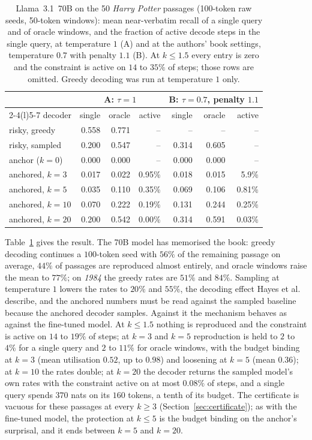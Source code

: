 \begin{table}[t]
\centering
\caption{Llama~3.1~70B on the 50 \emph{Harry Potter} passages (100-token raw seeds, 50-token windows): mean near-verbatim recall of a single query and of oracle windows, and the fraction of active decode steps in the single query, at temperature $1$ (A) and at the authors' book settings, temperature $0.7$ with penalty $1.1$ (B). At $k \le 1.5$ every entry is zero and the constraint is active on $14$ to $35\%$ of steps; those rows are omitted. Greedy decoding was run at temperature $1$ only.}
\label{tab:natural}
\footnotesize
\setlength{\tabcolsep}{2.6pt}
\begin{tabular}{@{}lrrrrrr@{}}
\toprule
& \multicolumn{3}{c}{A: $\tau=1$} & \multicolumn{3}{c}{B: $\tau=0.7$, penalty $1.1$} \\
\cmidrule(lr){2-4}\cmidrule(l){5-7}
decoder & single & oracle & active & single & oracle & active \\
\midrule
risky, greedy & 0.558 & 0.771 & -- & -- & -- & -- \\
risky, sampled & 0.200 & 0.547 & -- & 0.314 & 0.605 & -- \\
anchor ($k=0$) & 0.000 & 0.000 & -- & 0.000 & 0.000 & -- \\
anchored, $k=3$ & 0.017 & 0.022 & 0.95\% & 0.018 & 0.015 & 5.9\% \\
anchored, $k=5$ & 0.035 & 0.110 & 0.35\% & 0.069 & 0.106 & 0.81\% \\
anchored, $k=10$ & 0.070 & 0.222 & 0.19\% & 0.131 & 0.244 & 0.25\% \\
anchored, $k=20$ & 0.200 & 0.542 & 0.00\% & 0.314 & 0.591 & 0.03\% \\
\bottomrule
\end{tabular}
\end{table}

Table~\ref{tab:natural} gives the result. The 70B model has memorised the book: greedy decoding continues a $100$-token seed with $56\%$ of the remaining passage on average, $44\%$ of passages are reproduced almost entirely, and oracle windows raise the mean to $77\%$; on \emph{1984} the greedy rates are $51\%$ and $84\%$. Sampling at temperature $1$ lowers the rates to $20\%$ and $55\%$, the decoding effect Hayes et al.~\cite{hayes2025measuring} describe, and the anchored numbers must be read against the sampled baseline because the anchored decoder samples. Against it the mechanism behaves as against the fine-tuned model. At $k \le 1.5$ nothing is reproduced and the constraint is active on $14$ to $19\%$ of steps; at $k=3$ and $k=5$ reproduction is held to $2$ to $4\%$ for a single query and $2$ to $11\%$ for oracle windows, with the budget binding at $k=3$ (mean utilisation $0.52$, up to $0.98$) and loosening at $k=5$ (mean $0.36$); at $k=10$ the rates double; at $k=20$ the decoder returns the sampled model's own rates with the constraint active on at most $0.08\%$ of steps, and a single query spends $370$ nats on its $160$ tokens, a tenth of its budget. The certificate is vacuous for these passages at every $k \ge 3$ (Section~\ref{sec:certificate}); as with the fine-tuned model, the protection at $k \le 5$ is the budget binding on the anchor's surprisal, and it ends between $k=5$ and $k=20$.

